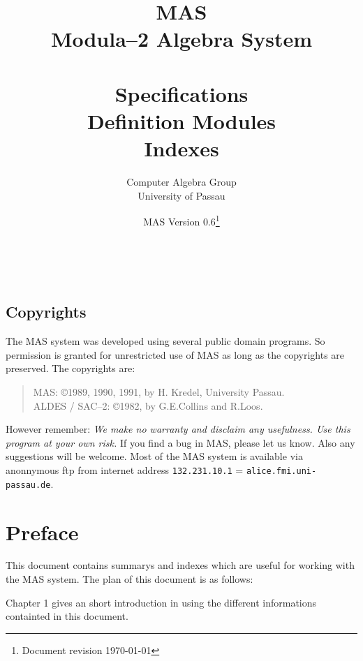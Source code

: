 
\title{MAS \\ Modula--2 Algebra System\\ 
       \mbox{ } \\
       Specifications \\ Definition Modules \\ Indexes}

\author{%
        Computer Algebra Group \\
        University of Passau
        }

\date{MAS Version 0.6\footnote{Document revision \today}
      }

\maketitle

\mbox{  }

\vfill

\section*{Copyrights}

The MAS system was developed using several 
public domain programs. 
So permission is granted for unrestricted use of MAS 
as long as the copyrights are preserved.
The copyrights are:
\begin{quote}
MAS: \copyright 1989, 1990, 1991, by H. Kredel, University Passau. \\
ALDES / SAC--2: \copyright 1982, by G.E.Collins and R.Loos.
\end{quote}
However remember:
{\em 
We make no warranty and disclaim any usefulness. 
Use this program at your own risk. 
}
If you find a bug in MAS, please let us know. 
Also any suggestions will be welcome. 
Most of the MAS system is available via anonnymous ftp 
from internet address \verb/132.231.10.1/ = 
\verb/alice.fmi.uni-passau.de/.


\chapter*{Preface}

This document contains summarys and indexes 
which are useful for working with the MAS system.
The plan of this document is as follows:

Chapter 1 
gives an short introduction in using the 
different informations containted in this document.

